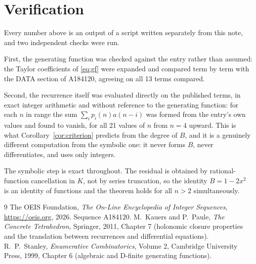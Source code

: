 \documentclass[11pt,a4paper]{article}
\theoremstyle{plain}
\theoremstyle{definition}
\begin{document}
\section{Verification}

Every number above is an output of a script written separately from this note, and two
independent checks were run.

First, the generating function was checked against the entry rather than assumed: the
Taylor coefficients of \eqref{eq:gf} were expanded and compared term by term with the DATA
section of A184120, agreeing on all 13 terms compared.

Second, the recurrence itself was evaluated directly on the published terms, in exact
integer arithmetic and without reference to the generating function: for each $n$ in range
the sum $\sum_{i}p_{i}(n)a(n-i)$ was formed from the entry's own values and found to
vanish, for all 21 values of $n$ from $n=4$ upward. This is what
Corollary~\ref{cor:criterion} predicts from the degree of $B$, and it is a genuinely
different computation from the symbolic one: it never forms $B$, never differentiates, and
uses only integers.

The symbolic step is exact throughout. The residual is obtained by rational-function
cancellation in $K$, not by series truncation, so the identity $B=1 - 2 x^{2}$ is an
identity of functions and the theorem holds for all $n>2$ simultaneously.

\begin{thebibliography}{9}
 The OEIS Foundation, \emph{The On-Line Encyclopedia of Integer Sequences},
\url{https://oeis.org}, 2026. Sequence A184120.
 M.~Kauers and P.~Paule, \emph{The Concrete Tetrahedron}, Springer, 2011,
Chapter 7 (holonomic closure properties and the translation between recurrences and
differential equations).
 R.~P.~Stanley, \emph{Enumerative Combinatorics}, Volume 2, Cambridge
University Press, 1999, Chapter 6 (algebraic and D-finite generating functions).
\end{thebibliography}
\end{document}

